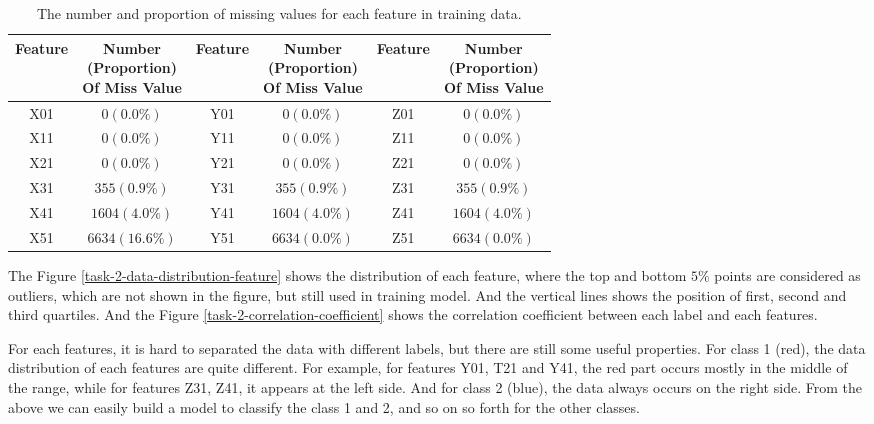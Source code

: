 \documentclass[11pt]{article}
\begin{document}
\begin{table}[H]
  \centering
  \begin{tabular}{|c|c|c|c|c|c|}
    \hline
    Feature & \makecell{Number                                               \\ (Proportion)                               \\ Of Miss Value} & Feature & \makecell{Number \\ (Proportion) \\ Of Miss Value} & Feature & \makecell{Number \\ (Proportion) \\ Of Miss Value} \\
    \hline
    X01     & $0 (0.0\%)$      & Y01 & $0 (0.0\%)$    & Z01 & $0 (0.0\%)$    \\
    \hline
    X11     & $0 (0.0\%)$      & Y11 & $0 (0.0\%)$    & Z11 & $0 (0.0\%)$    \\
    \hline
    X21     & $0 (0.0\%)$      & Y21 & $0 (0.0\%)$    & Z21 & $0 (0.0\%)$    \\
    \hline
    X31     & $355 (0.9\%)$    & Y31 & $355 (0.9\%)$  & Z31 & $355 (0.9\%)$  \\
    \hline
    X41     & $1604 (4.0\%)$   & Y41 & $1604 (4.0\%)$ & Z41 & $1604 (4.0\%)$ \\
    \hline
    X51     & $6634 (16.6\%)$  & Y51 & $6634 (0.0\%)$ & Z51 & $6634 (0.0\%)$ \\
    \hline
  \end{tabular}
  \caption{The number and proportion of missing values for each feature in training data.}
  \label{task-2-missing-value}
\end{table}

The Figure \ref{task-2-data-distribution-feature} shows the distribution of each feature, where the top and bottom $5\%$ points are considered as outliers, which are not shown in the figure, but still used in training model. And the vertical lines shows the position of first, second and third quartiles. And the Figure \ref{task-2-correlation-coefficient} shows the correlation coefficient between each label and each features.

For each features, it is hard to separated the data with different labels, but there are still some useful properties. For class 1 (red), the data distribution of each features are quite different. For example, for features Y01, T21 and Y41, the red part occurs mostly in the middle of the range, while for features Z31, Z41, it appears at the left side. And for class 2 (blue), the data always occurs on the right side. From the above we can easily build a model to classify the class 1 and 2, and so on so forth for the other classes.
\end{document}
